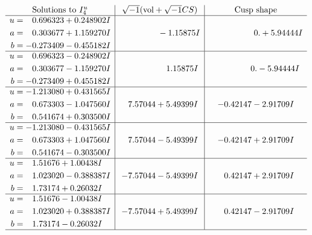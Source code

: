 \documentclass[1p]{elsarticle_modified}
\theoremstyle{definition}
\newcommand{\I}{\sqrt{-1}}
\begin{document}
$$\begin{array}{c|c|c}  
\text{Solutions to }I^u_{4}& \I (\text{vol} + \sqrt{-1}CS) & \text{Cusp shape}\\
 \hline 
\begin{aligned}
u &= \phantom{-}0.696323 + 0.248902 I \\
a &= \phantom{-}0.303677 + 1.159270 I \\
b &= -0.273409 - 0.455182 I\end{aligned}
 & \phantom{-0.000000 } -1.15875 I & \phantom{-0.000000 -}0. + 5.94444 I \\ \hline\begin{aligned}
u &= \phantom{-}0.696323 - 0.248902 I \\
a &= \phantom{-}0.303677 - 1.159270 I \\
b &= -0.273409 + 0.455182 I\end{aligned}
 & \phantom{-0.000000 -}1.15875 I & \phantom{-0.000000 } 0. - 5.94444 I \\ \hline\begin{aligned}
u &= -1.213080 + 0.431565 I \\
a &= \phantom{-}0.673303 - 1.047560 I \\
b &= \phantom{-}0.541674 + 0.303500 I\end{aligned}
 & \phantom{-}7.57044 + 5.49399 I & -0.42147 - 2.91709 I \\ \hline\begin{aligned}
u &= -1.213080 - 0.431565 I \\
a &= \phantom{-}0.673303 + 1.047560 I \\
b &= \phantom{-}0.541674 - 0.303500 I\end{aligned}
 & \phantom{-}7.57044 - 5.49399 I & -0.42147 + 2.91709 I \\ \hline\begin{aligned}
u &= \phantom{-}1.51676 + 1.00438 I \\
a &= \phantom{-}1.023020 - 0.388387 I \\
b &= \phantom{-}1.73174 + 0.26032 I\end{aligned}
 & -7.57044 - 5.49399 I & \phantom{-}0.42147 + 2.91709 I \\ \hline\begin{aligned}
u &= \phantom{-}1.51676 - 1.00438 I \\
a &= \phantom{-}1.023020 + 0.388387 I \\
b &= \phantom{-}1.73174 - 0.26032 I\end{aligned}
 & -7.57044 + 5.49399 I & \phantom{-}0.42147 - 2.91709 I\\
 \hline 
 \end{array}$$\newpage\newpage\renewcommand{\arraystretch}{1}
\end{document}
